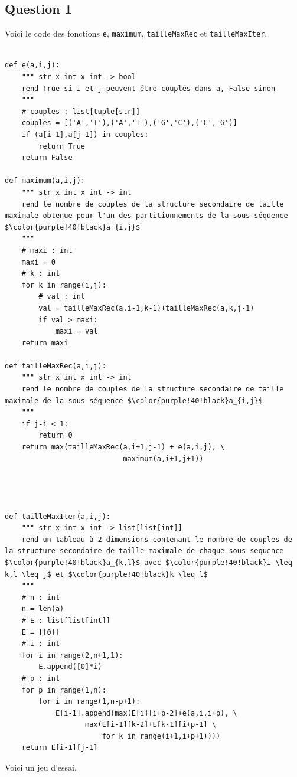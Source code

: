 \documentclass[12pt,a4paper]{article}
\begin{document}
\subsection*{Question 1}
Voici le code des fonctions \texttt{e}, \texttt{maximum}, \texttt{tailleMaxRec} et \texttt{tailleMaxIter}.
\begin{lstlisting}[mathescape]

def e(a,i,j):
    """ str x int x int -> bool
    rend True si i et j peuvent être couplés dans a, False sinon
    """
    # couples : list[tuple[str]]
    couples = [('A','T'),('A','T'),('G','C'),('C','G')]
    if (a[i-1],a[j-1]) in couples:
        return True
    return False

def maximum(a,i,j):
    """ str x int x int -> int
    rend le nombre de couples de la structure secondaire de taille maximale obtenue pour l'un des partitionnements de la sous-séquence $\color{purple!40!black}a_{i,j}$
    """
    # maxi : int
    maxi = 0
    # k : int
    for k in range(i,j):
        # val : int
        val = tailleMaxRec(a,i-1,k-1)+tailleMaxRec(a,k,j-1)
        if val > maxi:
            maxi = val
    return maxi

def tailleMaxRec(a,i,j):
    """ str x int x int -> int
    rend le nombre de couples de la structure secondaire de taille maximale de la sous-séquence $\color{purple!40!black}a_{i,j}$
    """
    if j-i < 1:
        return 0
    return max(tailleMaxRec(a,i+1,j-1) + e(a,i,j), \
                            maximum(a,i+1,j+1))




def tailleMaxIter(a,i,j):  
    """ str x int x int -> list[list[int]]
    rend un tableau à 2 dimensions contenant le nombre de couples de la structure secondaire de taille maximale de chaque sous-sequence $\color{purple!40!black}a_{k,l}$ avec $\color{purple!40!black}i \leq k,l \leq j$ et $\color{purple!40!black}k \leq l$
    """
    # n : int
    n = len(a)
    # E : list[list[int]]
    E = [[0]]
    # i : int
    for i in range(2,n+1,1):
        E.append([0]*i)
    # p : int
    for p in range(1,n):
        for i in range(1,n-p+1):
            E[i-1].append(max(E[i][i+p-2]+e(a,i,i+p), \
                   max(E[i-1][k-2]+E[k-1][i+p-1] \
                       for k in range(i+1,i+p+1))))
    return E[i-1][j-1]
\end{lstlisting}


Voici un jeu d'essai.
\end{document}
